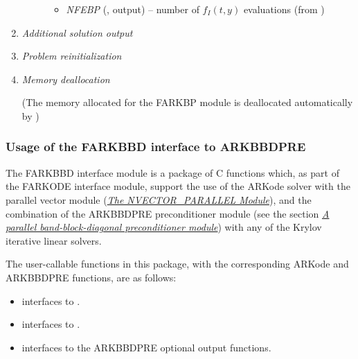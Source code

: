 \documentclass[letterpaper,10pt,english]{sphinxmanual}
\begin{document}
\begin{enumerate}
\begin{fulllineitems}
\begin{description}
\begin{itemize}
\item {} 
\emph{NFEBP} (, output) -- number of
$f_I(t,y)$ evaluations (from
{\hyperref[c_interface/Preconditioners:ARKBandPrecGetNumRhsEvals]{}})

\end{itemize}

\end{description}

\end{fulllineitems}


\item {} 
\emph{Additional solution output}

\item {} 
\emph{Problem reinitialization}

\item {} 
\emph{Memory deallocation}

(The memory allocated for the FARKBP module is deallocated
automatically by {\hyperref[f_interface/Usage:f/_/FARKFREE]{}})

\end{enumerate}


\subsubsection{Usage of the FARKBBD interface to ARKBBDPRE}
\label{f_interface/Preconditioning:usage-of-the-farkbbd-interface-to-arkbbdpre}\label{f_interface/Preconditioning:finterface-bbdpre}
The FARKBBD interface module is a package of C functions which, as
part of the FARKODE interface module, support the use of the ARKode
solver with the parallel vector module ({\hyperref[nvectors/NVector_Parallel:nvectors-nvparallel]{\emph{The NVECTOR\_PARALLEL Module}}}),
and the combination of the ARKBBDPRE preconditioner module (see the
section {\hyperref[c_interface/Preconditioners:cinterface-bbdpre]{\emph{A parallel band-block-diagonal preconditioner module}}}) with any of the Krylov iterative
linear solvers.

The user-callable functions in this package, with the corresponding
ARKode and ARKBBDPRE functions, are as follows:
\begin{itemize}
\item {} 
{\hyperref[f_interface/Preconditioning:f/_/FARKBBDINIT]{}} interfaces to {\hyperref[c_interface/Preconditioners:ARKBBDPrecInit]{}}.

\item {} 
{\hyperref[f_interface/Preconditioning:f/_/FARKBBDREINIT]{}} interfaces to {\hyperref[c_interface/Preconditioners:ARKBBDPrecReInit]{}}.

\item {} 
{\hyperref[f_interface/Preconditioning:f/_/FARKBBDOPT]{}} interfaces to the ARKBBDPRE optional output
functions.

\end{itemize}
\end{document}
